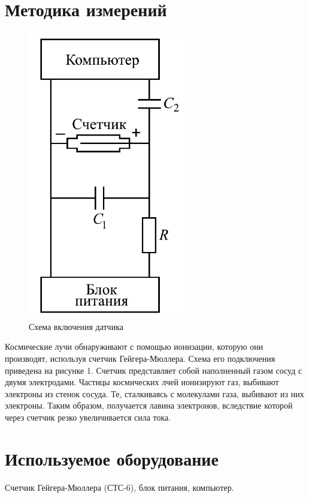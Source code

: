 \documentclass[a4paper, 12pt]{article}
\begin{document}
 	\section{Методика измерений}
	\begin{figure}[H]
		\centering
		\includegraphics[scale = 0.5]{pictures/scheme.png}
		\caption{Схема включения датчика}
	\end{figure}
	
	Космические лучи обнаруживают с помощью ионизации, которую они производят, используя счетчик Гейгера-Мюллера. Схема его подключения приведена на рисунке 1. Счетчик представляет собой наполненный газом сосуд с двумя электродами. Частицы космических лчей ионизируют газ, выбивают электроны из стенок сосуда. Те, сталкиваясь с молекулами газа, выбивают из них электроны. Таким образом, получается лавина электронов, вследствие которой через счетчик резко увеличивается сила тока.

	\section{Используемое оборудование}
	Счетчик Гейгера-Мюллера (СТС-6), блок питания, компьютер.
\end{document}
